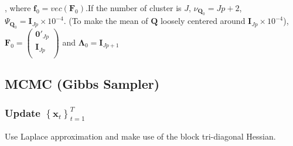 \documentclass[]{article}
\begin{document}
\begin{enumerate}
	, where \(\mathbf{f}_0 = vec(\mathbf{F}_0)\).If the number of cluster is \(J\), \(\nu_{\mathbf{Q}_{0}} = Jp + 2\),
	\(\Psi_{\mathbf{Q}_{0}} = \mathbf{I}_{Jp} \times 10^{- 4}\). (To make the mean of \(\mathbf{Q}\) loosely centered around
	\(\mathbf{I}_{Jp} \times 10^{- 4}\)), \(\mathbf{F}_0 = \begin{pmatrix}
		\mathbf{0}'_{Jp} \\
		\mathbf{I}_{Jp} \\
	\end{pmatrix}\) and \(\bm{\Lambda}_0 = \mathbf{I}_{Jp + 1}\)
	
\end{enumerate}

\subsection{MCMC (Gibbs Sampler)}

\subsubsection{Update \(\left\{ \mathbf{x}_{t} \right\}_{t=1}^T\)}
Use Laplace approximation and make use of the block tri-diagonal Hessian.
\end{document}
